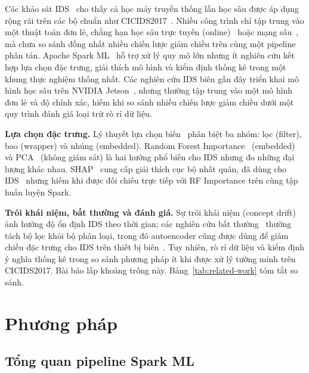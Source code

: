 \documentclass[conference]{IEEEtran}
\begin{document}
Các khảo sát IDS~\cite{ring2019survey,khraisat2019survey,ferrag2020deep} cho thấy cả học máy truyền thống lẫn học sâu được áp dụng rộng rãi trên các bộ chuẩn như CICIDS2017~\cite{sharafaldin2018toward}. Nhiều công trình chỉ tập trung vào một thuật toán đơn lẻ, chẳng hạn học sâu trực tuyến (online)~\cite{alrawashdeh2016toward} hoặc mạng sâu~\cite{vinayakumar2019deep}, mà chưa so sánh đồng nhất nhiều chiến lược giảm chiều trên cùng một pipeline phân tán. Apache Spark ML~\cite{zaharia2010spark,meng2016mllib} hỗ trợ xử lý quy mô lớn nhưng ít nghiên cứu kết hợp lựa chọn đặc trưng, giải thích mô hình và kiểm định thống kê trong một khung thực nghiệm thống nhất. Các nghiên cứu IDS biên gần đây triển khai mô hình học sâu trên NVIDIA Jetson~\cite{baalaji2025ensemble,asghar2026hedid}, nhưng thường tập trung vào một mô hình đơn lẻ và độ chính xác, hiếm khi so sánh nhiều chiến lược giảm chiều dưới một quy trình đánh giá loại trừ rò rỉ dữ liệu.

\textbf{Lựa chọn đặc trưng.} Lý thuyết lựa chọn biến~\cite{guyon2003introduction} phân biệt ba nhóm: lọc (filter), bao (wrapper) và nhúng (embedded). Random Forest Importance~\cite{breiman2001random} (embedded) và PCA~\cite{jolliffe2002pca} (không giám sát) là hai hướng phổ biến cho IDS nhưng đo những đại lượng khác nhau. SHAP~\cite{lundberg2017unified} cung cấp giải thích cục bộ nhất quán, đã dùng cho IDS~\cite{sarhan2022explainable} nhưng hiếm khi được đối chiếu trực tiếp với RF Importance trên cùng tập huấn luyện Spark.

\textbf{Trôi khái niệm, bất thường và đánh giá.} Sự trôi khái niệm (concept drift)~\cite{gama2014survey} ảnh hưởng độ ổn định IDS theo thời gian; các nghiên cứu bất thường~\cite{chandola2009anomaly,ruff2021unifying,lopez2017autoencoder,hasan2025iiot} thường tách bộ lọc khỏi bộ phân loại, trong đó autoencoder cũng được dùng để giảm chiều đặc trưng cho IDS trên thiết bị biên~\cite{hasan2025iiot}. Tuy nhiên, rò rỉ dữ liệu và kiểm định ý nghĩa thống kê trong so sánh phương pháp ít khi được xử lý tường minh trên CICIDS2017. Bài báo lấp khoảng trống này. Bảng~\ref{tab:related-work} tóm tắt so sánh.



\section{Phương pháp}
\label{sec:method}

\subsection{Tổng quan pipeline Spark ML}
\end{document}
